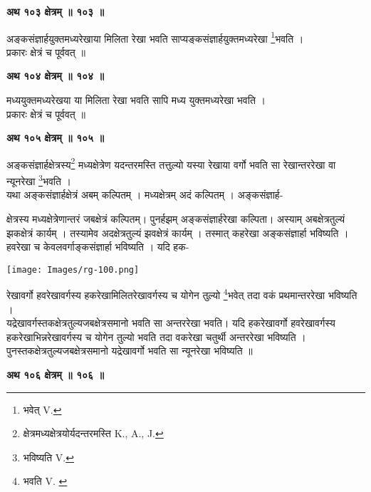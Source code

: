 \documentclass[11pt, openany]{book}
\begin{document}
\begin{center}
\textbf{\large अथ १०३ क्षेत्रम् ॥ १०३ ॥}
\end{center}

{\ab अङ्कसंज्ञार्हयुक्तमध्यरेखाया मिलिता रेखा भवति साप्यङ्कसंज्ञार्हयुक्तमध्यरेखा \renewcommand{\thefootnote}{१}\footnote{भवेत् {\en V.} }भवति । }\\

प्रकारः क्षेत्रं च पूर्ववत् ॥ 
\begin{center}
\textbf{\large अथ १०४ क्षेत्रम् ॥ १०४ ॥}
\end{center}

{\ab मध्ययुक्तमध्यरेखया या मिलिता रेखा भवति सापि मध्य  
युक्तमध्यरेखा भवति । }\\

प्रकारः क्षेत्रं च पूर्ववत् ॥ 
\begin{center}
\textbf{\large अथ १०५ क्षेत्रम् ॥ १०५ ॥}
\end{center}

{\ab अङ्कसंज्ञार्हक्षेत्रस्य\renewcommand{\thefootnote}{२}\footnote{क्षेत्रमध्यक्षेत्रयोर्यदन्तरमस्ति {\en K., A., J.} } मध्यक्षेत्रेण यदन्तरमस्ति तत्तुल्यो यस्या रेखाया वर्गो भवति सा रेखान्तररेखा वा न्यूनरेखा \renewcommand{\thefootnote}{3}\footnote{भविष्यति
{\en V.}}भवति । }\\

 यथा अङ्कसंज्ञार्हक्षेत्रं अबम् कल्पितम् । मध्यक्षेत्रम् अदं कल्पितम् ।
अङ्कसंज्ञार्ह-
\begin{vwcol}[widths={0.6,0.4}, sep=.8cm, rule=0pt]
क्षेत्रस्य मध्यक्षेत्रेणान्तरं जबक्षेत्रं कल्पितम्। पुनर्हझम् अङ्कसंज्ञार्हरेखा कल्पिता।
अस्याम् अबक्षेत्रतुल्यं झकक्षेत्रं कार्यम् । तस्यामेव अदक्षेत्रतुल्यं झवक्षेत्रं कार्यम् । तस्मात्
कहरेखा अङ्कसंज्ञार्हा भविष्यति । हवरेखा च केवलवर्गाङ्कसंज्ञार्हा भविष्यति । यदि हक-\\
\vspace{-4mm}

\noindent \texttt{[image: Images/rg-100.png]}
\end{vwcol}


\newpage
\noindent रेखावर्गो हवरेखावर्गस्य हकरेखामिलितरेखावर्गस्य च योगेन तुल्यो
\renewcommand{\thefootnote}{१}\footnote{भवति {\en V. }}भवेत् तदा वकं प्रथमान्तररेखा भविष्यति ।\\

यद्रेखावर्गस्तकक्षेत्रतुल्यजबक्षेत्रसमानो भवति सा अन्तररेखा भवति। यदि हकरेखावर्गो हवरेखावर्गस्य हकरेखाभिन्नरेखावर्गस्य च योगेन तुल्यो भवति तदा वकरेखा चतुर्थी अन्तररेखा भविष्यति । पुनस्तकक्षेत्रतुल्यजबक्षेत्रसमानो यद्रेखावर्गो भवति सा न्यूनरेखा
भविष्यति ॥\\
\begin{center}
\textbf{\large अथ १०६ क्षेत्रम् ॥ १०६ ॥}
\end{center}
\vspace{2mm}
\end{document}
